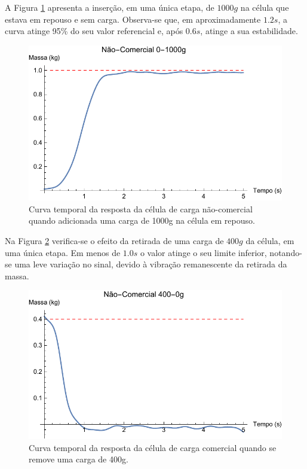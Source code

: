 \documentclass[a4paper]{instrumentacao}
\begin{document}
A Figura \ref{fig:celula-nao-comercial-resultado-0-1000g} apresenta a inserção, em uma única etapa, de $1000g$ na célula que estava em repouso e sem carga. Observa-se que, em aproximadamente $1.2s$, a curva atinge 95\% do seu valor referencial e, após $0.6s$, atinge a sua estabilidade.

\begin{figure}[H]
\center
\includegraphics[width=\textwidth]{NaoComercial_0-1000g.pdf}
\caption{Curva temporal da resposta da célula de carga não-comercial quando adicionada uma carga de 1000g na célula em repouso.}
\label{fig:celula-nao-comercial-resultado-0-1000g}
\end{figure}

Na Figura \ref{fig:celula-nao-comercial-resultado-400-0g} verifica-se o efeito da retirada de uma carga de $400g$ da célula, em uma única etapa. Em menos de $1.0s$ o valor atinge o seu limite inferior, notando-se uma leve variação no sinal, devido à vibração remanescente da retirada da massa.

\begin{figure}[H]
\center
\includegraphics[width=\textwidth]{NaoComercial_400g-0.pdf}
\caption{Curva temporal da resposta da célula de carga comercial quando se remove uma carga de 400g.}
\label{fig:celula-nao-comercial-resultado-400-0g}
\end{figure}
\end{document}

